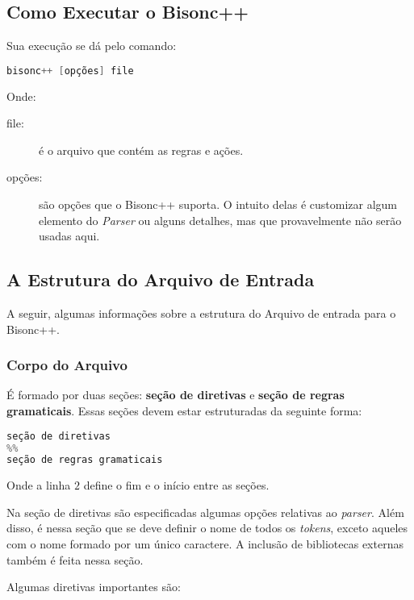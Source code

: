 \begin{apendicesenv}
\subsection{Como Executar o Bisonc++}
Sua execução se dá pelo comando:

\begin{lstlisting}[language=c, caption=Comando para Executar Bisonc++]
bisonc++ [opções] file
\end{lstlisting}

\par
\indent Onde:
\begin{description}
\item[file:] é o arquivo que contém as regras e ações.
\item[opções:] são opções que o Bisonc++ suporta. O intuito delas é customizar algum elemento do \textit{Parser} ou alguns detalhes, mas que provavelmente não serão usadas aqui.
\end{description}

\subsection{A Estrutura do Arquivo de Entrada}
A seguir, algumas informações sobre a estrutura do Arquivo de entrada para o Bisonc++.

\subsubsection{Corpo do Arquivo}

É formado por duas seções: \textbf{seção de diretivas} e \textbf{seção de regras gramaticais}. Essas seções devem estar estruturadas da seguinte forma:

\begin{lstlisting}[language=c, caption=Corpo do Arquivo do Bisonc++]
seção de diretivas
%%
seção de regras gramaticais
\end{lstlisting}
\par
\indent Onde a linha $2$ define o fim e o início entre as seções.

Na seção de diretivas são especificadas algumas opções relativas ao \textit{parser}. Além disso, é nessa seção que se deve definir o nome de todos os \textit{tokens}, exceto aqueles com o nome formado por um único caractere. A inclusão de bibliotecas externas também é feita nessa seção.

\par
\indent Algumas diretivas importantes são:


\end{apendicesenv}
